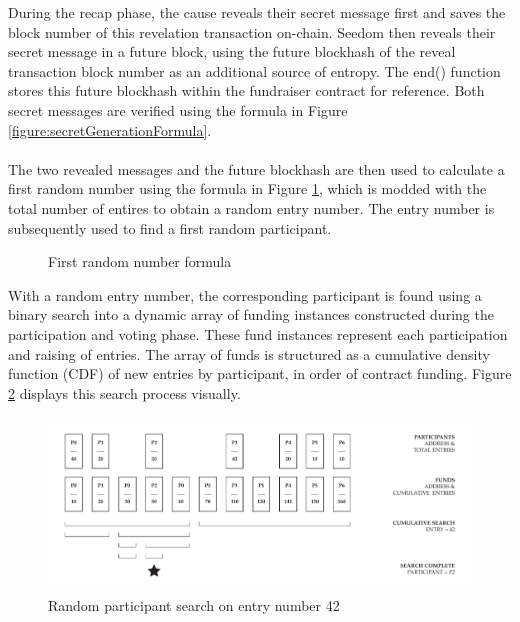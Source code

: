 \documentclass[11pt]{article}
\begin{document}
During the recap phase, the cause reveals their secret message first and saves the block number of this revelation transaction on-chain. Seedom then reveals their secret message in a future block, using the future blockhash of the reveal transaction block number as an additional source of entropy. The end() function stores this future blockhash within the fundraiser contract for reference. Both secret messages are verified using the formula in Figure \ref{figure:secretGenerationFormula}.\\\\
The two revealed messages and the future blockhash are then used to calculate a first random number using the formula in Figure \ref{figure:firstRandomNumberForumla}, which is modded with the total number of entires to obtain a random entry number. The entry number is subsequently used to find a first random participant.

\begin{figure}[H]
\begin{center}
\caption{First random number formula}
\label{figure:firstRandomNumberForumla}
\end{center}
\end{figure}

With a random entry number, the corresponding participant is found using a binary search into a dynamic array of funding instances constructed during the participation and voting phase. These fund instances represent each participation and raising of entries. The array of funds is structured as a cumulative density function (CDF) of new entries by participant, in order of contract funding. Figure \ref{figure:randomParticipantSearch} displays this search process visually.

\begin{figure}[H]
\begin{center}
\includegraphics[width=1.0\textwidth]{./graphics/random-participant-search.pdf}
\caption{Random participant search on entry number 42}
\label{figure:randomParticipantSearch}
\end{center}
\end{figure}
\end{document}
